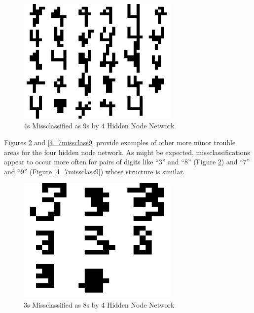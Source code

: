 \documentclass{article}
\begin{document}
\begin{figure}
\centering
\includegraphics[width=0.7\textwidth]{data/final/4_test_4missclass9.png}
\caption{4s Missclassified as 9s by 4 Hidden Node Network}
\label{4_4missclass9}
\end{figure}

Figures \ref{4_3missclass8} and \ref{4_7missclass9} provide examples of other more minor trouble areas for the four hidden node network. As might be expected, missclassifications appear to occur more often for pairs of digits like ``3'' and ``8'' (Figure \ref{4_3missclass8}) and ``7'' and ``9'' (Figure \ref{4_7missclass9}) whose structure is similar.

\begin{figure}
\centering
\includegraphics[width=0.7\textwidth]{data/final/4_test_3missclass8.png}
\caption{3s Missclassified as 8s by 4 Hidden Node Network}
\label{4_3missclass8}
\end{figure}
\end{document}
